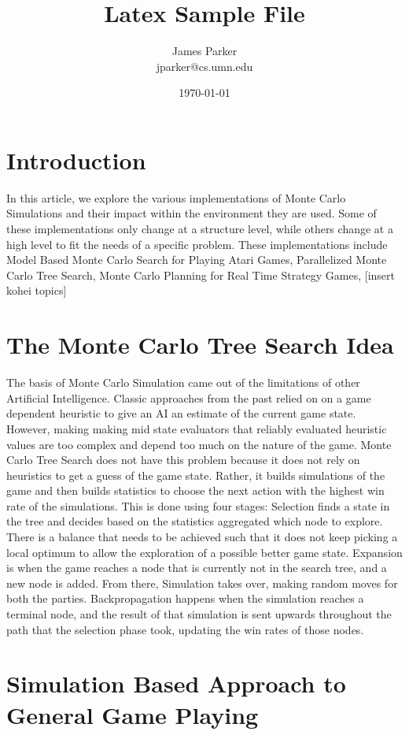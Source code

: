 \documentclass[11pt]{article}
\title{Latex Sample File}
\author{
James Parker\\jparker@cs.umn.edu
}
\date{\today}
\begin{document}
\maketitle

\section{Introduction}

In this article, we explore the various implementations of Monte Carlo Simulations and their impact within the environment they are used. Some of these implementations only change at a structure level, while others change at a high level to fit the needs of a specific problem. These implementations include Model Based Monte Carlo Search for Playing Atari Games, Parallelized Monte Carlo Tree Search, Monte Carlo Planning for Real Time Strategy Games, [insert kohei topics]

\section{The Monte Carlo Tree Search Idea}

The basis of Monte Carlo Simulation came out of the limitations of other Artificial Intelligence. Classic approaches from the past relied on on a game dependent heuristic to give an AI an estimate of the current game state. However, making making mid state evaluators that reliably evaluated heuristic values are too complex and depend too much on the nature of the game. \cite{chaslot2008monte} Monte Carlo Tree Search does not have this problem because it does not rely on heuristics to get a guess of the game state. Rather, it builds simulations of the game and then builds statistics to choose the next action with the highest win rate of the simulations. This is done using four stages: Selection finds a state in the tree and decides based on the statistics aggregated which node to explore. There is a balance that needs to be achieved such that it does not keep picking a local optimum to allow the exploration of a possible better game state. Expansion is when the game reaches a node that is currently not in the search tree, and a new node is added. From there, Simulation takes over, making random moves for both the parties. Backpropagation happens when the simulation reaches a terminal node, and the result of that simulation is sent upwards throughout the path that the selection phase took, updating the win rates of those nodes. 

\section{Simulation Based Approach to General Game Playing}
\end{document}
